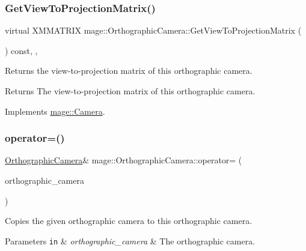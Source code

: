 \subsubsection{\texorpdfstring{Get\+View\+To\+Projection\+Matrix()}{GetViewToProjectionMatrix()}}
{\footnotesize\ttfamily virtual X\+M\+M\+A\+T\+R\+IX mage\+::\+Orthographic\+Camera\+::\+Get\+View\+To\+Projection\+Matrix (\begin{DoxyParamCaption}{ }\end{DoxyParamCaption}) const\hspace{0.3cm}{\ttfamily [override]}, {\ttfamily [private]}, {\ttfamily [virtual]}}

Returns the view-\/to-\/projection matrix of this orthographic camera.

\begin{DoxyReturn}{Returns}
The view-\/to-\/projection matrix of this orthographic camera. 
\end{DoxyReturn}


Implements \hyperlink{classmage_1_1_camera_a1f5206864cf18b5548219492556df5d2}{mage\+::\+Camera}.

\hypertarget{classmage_1_1_orthographic_camera_a8ea679c9b4c3d2c6aef40119dbf60921}{}\label{classmage_1_1_orthographic_camera_a8ea679c9b4c3d2c6aef40119dbf60921} 
\subsubsection{\texorpdfstring{operator=()}{operator=()}\hspace{0.1cm}{\footnotesize\ttfamily [1/2]}}
{\footnotesize\ttfamily \hyperlink{classmage_1_1_orthographic_camera}{Orthographic\+Camera}\& mage\+::\+Orthographic\+Camera\+::operator= (\begin{DoxyParamCaption}\item[{const \hyperlink{classmage_1_1_orthographic_camera}{Orthographic\+Camera} \&}]{orthographic\+\_\+camera }\end{DoxyParamCaption})\hspace{0.3cm}{\ttfamily [private]}}

Copies the given orthographic camera to this orthographic camera.


\begin{DoxyParams}[1]{Parameters}
\mbox{\tt in}  & {\em orthographic\+\_\+camera} & The orthographic camera. \\
\hline
\end{DoxyParams}
\hypertarget{classmage_1_1_orthographic_camera_a0b6856bd3e7a3402300225470e7d10e8}{}\label{classmage_1_1_orthographic_camera_a0b6856bd3e7a3402300225470e7d10e8} 
